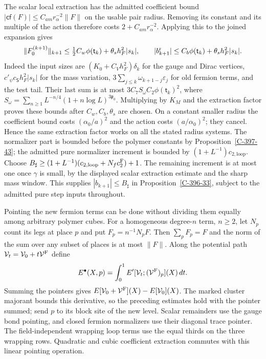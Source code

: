\documentclass[11pt,letterpaper,reqno]{amsart}
\theoremstyle{definition}
\theoremstyle{remark}
\begin{document}
The scalar local extraction has the admitted coefficient
bound $|\mathsf{cf}(F)|\le C_{am}r_\alpha^{-2}\|F\|$ on
the usable pair radius.  Removing its constant and its
multiple of the action therefore costs
$2+C_{am}r_\alpha^{-2}$.  Applying this to the joined
expansion gives
\[
 \|F_0^{(k+1)}\|_{k+1}\le
       \tfrac12C_w\phi(\mathsf t_k)+\theta_sh_F^2|s_k|,
 \qquad |b_{k+1}^{\rm r}|\le
       C_b\phi(\mathsf t_k)+\theta_sh_F^2|s_k|.
\]
Indeed the input sizes are
$(K_0+C_Vh_F^2)\delta_k$ for the gauge and Dirac vertices,
$c'_\psi c_{\mathsf S}h_F^2|s_k|$ for the mass variation,
$3\sum_{j\le k}\omega_{k+1-j}\varepsilon_j$ for old
fermion terms, and the test tail.  Their last sum is at
most $3C_7S_\omega C_2\phi(\mathsf t_k)^2$, where
$S_\omega=\sum_{n\ge1}L^{-n/4}(1+n\log L)^{3\mathfrak p_0}$.
Multiplying by $K_M$ and the extraction factor proves
these bounds after $C_w,C_b,\theta_s$ are chosen.
On a constant smaller radius the coefficient bound
costs $(\alpha_0/a)^2$ and the action costs
$(a/\alpha_0)^2$; they cancel.  Hence the same extraction
factor works on all the stated radius systems.
The normalizer part is bounded before the polymer
constants by Proposition~\ref{C-397-43}; the admitted
pure normalizer increment is bounded by
$(1+L^{-1})c_{2,\mathrm{loop}}$.
Choose
$B_\sharp\ge(1+L^{-1})(c_{2,\mathrm{loop}}+
N_fc_2^{\rm F})+1$.
The remaining increment is at most one once
$\gamma$ is small, by the displayed scalar
extraction estimate and the sharp mass window.
This supplies $|b_{k+1}|\le B_\sharp$ in
Proposition~\ref{C-396-33}, subject to the
admitted pure step inputs throughout.

Pointing the new fermion terms can be done without
dividing them equally among arbitrary polymer cubes.
For a homogeneous degree-$n$ term, $n\ge2$, let
$N_p$ count its legs at place $p$ and put
$F_p=n^{-1}N_pF$.  Then $\sum_pF_p=F$ and the norm
of the sum over any subset of places is at most
$\|F\|$.  Along the potential path
$\mathcal V_t=\mathcal V_0+t\mathcal V^{\rm F}$ define
\[
 E^\bullet(X,p)=\int_0^1
       E'[\mathcal V_t;(\mathcal V^{\rm F})_p](X)\,dt.
\]
Summing the pointers gives
$E[\mathcal V_0+\mathcal V^{\rm F}](X)-
E[\mathcal V_0](X)$.  The marked cluster majorant
bounds this derivative, so the preceding estimates
hold with the pointer summed; send $p$ to its block
site of the new level.  Scalar remainders use the
gauge bond pointing, and closed fermion
normalizers use their diagonal trace pointer.  The
field-independent wrapping loop terms use the
equal thirds on the three wrapping rows.
Quadratic and cubic coefficient extraction commutes
with this linear pointing operation.
\end{document}

